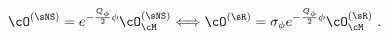 \begin{equation}
\cO^{(\sNS)}=e^{-{Q_{\phi}\over 2}\phi}\cO^{(\sNS)}_{\cM}\Longleftrightarrow
\cO^{(\sR)}=\sigma_{\phi}e^{-{Q_{\phi}\over 2}\phi}\cO^{(\sR)}_{\cM}~.
\end{equation}

